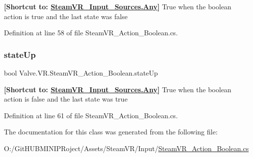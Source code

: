 {\bfseries{\mbox{[}Shortcut to\+: \mbox{\hyperlink{namespace_valve_1_1_v_r_a82e5bf501cc3aa155444ee3f0662853faed36a1ef76a59ee3f15180e0441188ad}{Steam\+V\+R\+\_\+\+Input\+\_\+\+Sources.\+Any}}\mbox{]}}} True when the boolean action is true and the last state was false 



Definition at line 58 of file Steam\+V\+R\+\_\+\+Action\+\_\+\+Boolean.\+cs.

\mbox{\label{class_valve_1_1_v_r_1_1_steam_v_r___action___boolean_a72a8ac9f25770fb138e9c774bff57570}} 
\subsubsection{\texorpdfstring{stateUp}{stateUp}}
{\footnotesize\ttfamily bool Valve.\+V\+R.\+Steam\+V\+R\+\_\+\+Action\+\_\+\+Boolean.\+state\+Up\hspace{0.3cm}{\ttfamily [get]}}



{\bfseries{\mbox{[}Shortcut to\+: \mbox{\hyperlink{namespace_valve_1_1_v_r_a82e5bf501cc3aa155444ee3f0662853faed36a1ef76a59ee3f15180e0441188ad}{Steam\+V\+R\+\_\+\+Input\+\_\+\+Sources.\+Any}}\mbox{]}}} True when the boolean action is false and the last state was true 



Definition at line 61 of file Steam\+V\+R\+\_\+\+Action\+\_\+\+Boolean.\+cs.



The documentation for this class was generated from the following file\+:\begin{DoxyCompactItemize}
\item 
O\+:/\+Git\+H\+U\+B\+M\+I\+N\+I\+P\+Roject/\+Assets/\+Steam\+V\+R/\+Input/\mbox{\hyperlink{_steam_v_r___action___boolean_8cs}{Steam\+V\+R\+\_\+\+Action\+\_\+\+Boolean.\+cs}}\end{DoxyCompactItemize}
